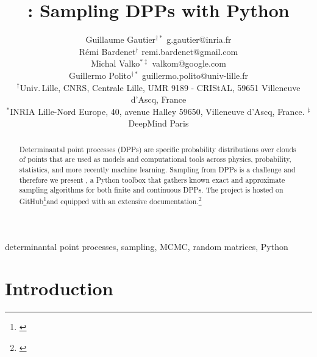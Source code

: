 \documentclass[twoside,11pt]{article}
\begin{document}
\title{\DPPy: Sampling DPPs with Python}

\author{\name Guillaume Gautier$^{\dagger*}$ \email g.gautier@inria.fr \\
       \name R\'emi Bardenet$^\dagger$ \email remi.bardenet@gmail.com \\
       \name Michal Valko$^{*\ddag}$ \email valkom@google.com\\
       \name Guillermo Polito$^{\dagger*}$ \email guillermo.polito@univ-lille.fr\\
       \addr $^\dagger$Univ.\,Lille, CNRS, Centrale Lille, UMR 9189 - CRIStAL, 59651 Villeneuve d'Ascq, France\\
       \addr $^*$INRIA Lille-Nord Europe, 40, avenue Halley 59650, Villeneuve d'Ascq, France. \addr $^\ddag$DeepMind Paris
}

\editor{}

\maketitle

\vspace{-3em}
\setcounter{footnote}{3}
\begin{abstract}%
    Determinantal point processes (DPPs) are specific probability distributions over clouds of points that are used as models and computational tools across physics, probability, statistics, and more recently machine learning.
    Sampling from DPPs is a challenge and therefore we present \DPPy, a Python toolbox that gathers known exact and approximate sampling algorithms for both finite and continuous DPPs.
    The project is hosted on GitHub\!\footnote{\label{fn:github}\footGitHubDPPy}and equipped with an extensive documentation.\!\!\footnote{\label{fn:docs}\footReadTheDocs}
\end{abstract}

\begin{keywords}%
    determinantal point processes,
    sampling,
    MCMC,
    random matrices,
    Python
\end{keywords}

\section{Introduction} %
\label{sec:introduction}
\end{document}
